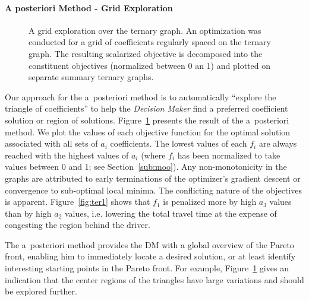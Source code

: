 \paragraph{A posteriori Method - Grid Exploration}
\begin{figure}[t]
\centering
{}%
%
%
%

\caption{A grid exploration over the ternary graph. An optimization was conducted for a grid of coefficients regularly spaced on the ternary graph. The resulting scalarized objective is decomposed into the constituent objectives (normalized between 0 an 1) and plotted on separate summary ternary graphs.}
\label{fig:triangles}
\end{figure}
Our approach for the a~posteriori method is to automatically ``explore the triangle of coefficients'' to help the \emph{Decision Maker} find a preferred coefficient solution or region of solutions. Figure~\ref{fig:triangles} presents the result of the a~posteriori method. We plot the values of each objective function for the optimal solution associated with all sets of $a_i$ coefficients. The lowest values of each $f_i$ are always reached with the highest values of $a_i$ (where $f_i$ has been normalized to take values between 0 and 1; see Section~\ref{sub:moo}). Any non-monotonicity in the graphs are attributed to early terminations of the optimizer's gradient descent or convergence to sub-optimal local minima. The conflicting nature of the objectives is apparent. Figure~\ref{fig:ter1} shows that $f_1$ is penalized more by high $a_3$ values than by high $a_2$ values, i.e. lowering the total travel time at the expense of congesting the region behind the driver.

The a~posteriori method provides the DM with a global overview of the Pareto front, enabling him to immediately locate a desired solution, or at least identify interesting starting points in the Pareto front. For example, Figure~\ref{fig:triangles} gives an indication that the center regions of the triangles have large variations and should be explored further.

